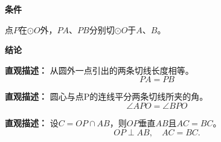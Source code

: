 \begin{statementbox}
	\textbf{\textcolor{CStatement}{条件}}
	\begin{description}[style=nextline, leftmargin=2.8em, labelsep=0.5em, itemsep=0.35em]
		\item[\textbf{\textcolor{CStatement}{条件1（切线条件）：}}]
			点$P$在$\odot O$外，$PA$、$PB$分别切$\odot O$于$A$、$B$。
	\end{description}
	\textbf{\textcolor{CStatement}{结论}}
	\begin{description}[style=nextline, leftmargin=2.8em, labelsep=0.5em, itemsep=0.45em]
		\item[\textbf{\textcolor{CStatement}{结论一（切线长相等）：}}]
			\textbf{\textcolor{CStatement}{直观描述：}}
			从圆外一点引出的两条切线长度相等。
			\[
				PA=PB
			\]
		\item[\textbf{\textcolor{CStatement}{结论二（角平分关系）：}}]
			\textbf{\textcolor{CStatement}{直观描述：}}
			圆心与点P的连线平分两条切线所夹的角。
			\[
				\angle APO = \angle BPO
			\]
		\item[\textbf{\textcolor{CStatement}{推广结论（垂直平分弦）：}}]
			\textbf{\textcolor{CStatement}{直观描述：}}
			设$C=OP\cap AB$，则$OP$垂直$AB$且$AC=BC$。
			\[
				OP\perp AB,\quad AC=BC.
			\]
	\end{description}

\end{statementbox}
